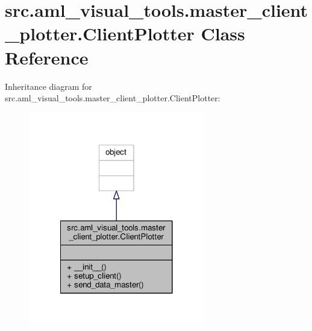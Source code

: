 \hypertarget{classsrc_1_1aml__visual__tools_1_1master__client__plotter_1_1_client_plotter}{\section{src.\-aml\-\_\-visual\-\_\-tools.\-master\-\_\-client\-\_\-plotter.\-Client\-Plotter Class Reference}
\label{classsrc_1_1aml__visual__tools_1_1master__client__plotter_1_1_client_plotter}
}


Inheritance diagram for src.\-aml\-\_\-visual\-\_\-tools.\-master\-\_\-client\-\_\-plotter.\-Client\-Plotter\-:\nopagebreak
\begin{figure}[H]
\begin{center}
\leavevmode
\includegraphics[width=218pt]{classsrc_1_1aml__visual__tools_1_1master__client__plotter_1_1_client_plotter__inherit__graph}
\end{center}
\end{figure}


